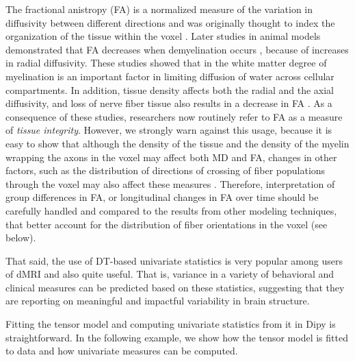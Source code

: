 \documentclass{bioinfo}
\begin{document}
The fractional anistropy (FA) is a normalized measure of the variation in
diffusivity between different directions and was originally thought to index
the organization of the tissue within the voxel \citep{Basser1996}. Later
studies in animal models demonstrated that FA decreases when demyelination
occurs \citep{Song2002}, because of increases in radial diffusivity. These
studies showed that in the white matter degree of myelination is an important
factor in limiting diffusion of water across cellular compartments. In
addition, tissue density affects both the radial and the axial diffusivity, and
loss of nerve fiber tissue also results in a decrease in FA \citep{Beaulieu1996,
Beaulieu2002}. As a consequence of these studies, researchers now routinely
refer to FA as a measure of \emph{tissue integrity}. However, we
strongly warn against this usage, because it is easy to show that
although the density of the
tissue and the density of the myelin wrapping the axons in the voxel may affect
both MD and FA, changes in other factors, such as the distribution of
directions of crossing of fiber populations through the voxel may also affect
these measures
\citep{Basser1996,wandell-yeatman:13,jones-etal:13}. Therefore,
interpretation
of group differences in FA, or longitudinal changes in FA over time should be
carefully handled and compared to the results from other modeling techniques,
that better account for the distribution of fiber orientations in the voxel
(see below).

That said, the use of DT-based univariate statistics is very popular among
users of dMRI and also quite useful. That is, variance in a variety of
behavioral \citep{Ben-Shachar2007} and clinical \citep{Thomason2011} measures
can be predicted based on these statistics, suggesting that they are reporting on meaningful and
impactful variability in brain structure.

Fitting the tensor model and computing univariate statistics from it in Dipy is
straightforward. In the following example, we show how the tensor
model is fitted to data and how univariate measures can be computed.
\end{document}
